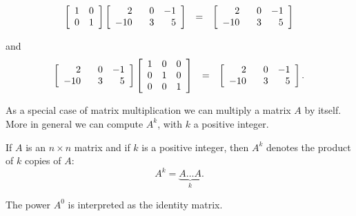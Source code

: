 \[\begin{array}{rcl}
\left[ \begin{array}{rr} 1 & 0 \\ 0 & 1 \\ \end{array} \right] \left[\begin{array}{rrr} 2 & \hphantom{-}0 & -1 \\ -10 & 3 & 5 \\ \end{array} \right] & = & \left[\begin{array}{rrr} 2 & \hphantom{-}0 & -1 \\ -10 & 3 & 5 \\ \end{array} \right] \\ \end{array}\]

and
\[\begin{array}{rcl}
\left[\begin{array}{rrr} 2 & \hphantom{-}0 & -1 \\ -10 & 3 & 5 \\ \end{array} \right]\left[ \begin{array}{rrr} 1 & 0 & 0 \\ 0 & 1 & 0 \\ 0 & 0 & 1 \\ \end{array} \right] & = & \left[\begin{array}{rrr} 2 & \hphantom{-}0 & -1 \\ -10 & 3 & 5 \\ \end{array} \right]. \\ \end{array}\]

\smallskip


As a special case of matrix multiplication we can multiply a matrix $A$ by itself. More in general we can compute $A^k$, with $k$ a positive integer. 

\begin{definition}\label{matrixpower}
If $A$ is an $n \times n$ matrix and if $k$ is a positive integer, then $A^k$ denotes the product of $k$ copies of $A$:
\[ A^k = \underbrace{A \ldots A}_{k} . \]
\end{definition}
The power $A^0$ is interpreted as the identity matrix.


